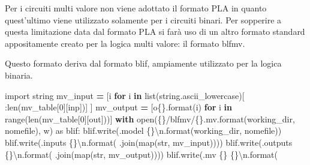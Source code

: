 \documentclass[
]{book}
\newenvironment{Shaded}{\begin{snugshade}}{\end{snugshade}}
\newcommand{\BuiltInTok}[1]{#1}
\newcommand{\CharTok}[1]{\textcolor[rgb]{0.31,0.60,0.02}{#1}}
\newcommand{\ControlFlowTok}[1]{\textcolor[rgb]{0.13,0.29,0.53}{\textbf{#1}}}
\newcommand{\DecValTok}[1]{\textcolor[rgb]{0.00,0.00,0.81}{#1}}
\newcommand{\ImportTok}[1]{#1}
\newcommand{\KeywordTok}[1]{\textcolor[rgb]{0.13,0.29,0.53}{\textbf{#1}}}
\newcommand{\NormalTok}[1]{#1}
\newcommand{\OperatorTok}[1]{\textcolor[rgb]{0.81,0.36,0.00}{\textbf{#1}}}
\newcommand{\SpecialCharTok}[1]{\textcolor[rgb]{0.00,0.00,0.00}{#1}}
\newcommand{\StringTok}[1]{\textcolor[rgb]{0.31,0.60,0.02}{#1}}
\begin{document}
Per i circuiti multi valore non viene adottato il formato PLA in quanto quest'ultimo viene utilizzato solamente per i circuiti binari. Per sopperire a questa limitazione data dal formato PLA si farà uso di un altro formato standard appositamente creato per la logica multi valore: il formato blfmv.

Questo formato deriva dal formato blif, ampiamente utilizzato per la logica binaria.

\begin{Shaded}
\begin{Highlighting}[]
\ImportTok{import}\NormalTok{ string}
\NormalTok{mv\_input }\OperatorTok{=}\NormalTok{ [i }\ControlFlowTok{for}\NormalTok{ i }\KeywordTok{in} \BuiltInTok{list}\NormalTok{(string.ascii\_lowercase)[}
\NormalTok{    :}\BuiltInTok{len}\NormalTok{(mv\_table[}\DecValTok{0}\NormalTok{][}\StringTok{\textquotesingle{}inp\textquotesingle{}}\NormalTok{])]}
\NormalTok{  ]}
\NormalTok{mv\_output }\OperatorTok{=}\NormalTok{ [}\StringTok{\textquotesingle{}o}\SpecialCharTok{\{\}}\StringTok{\textquotesingle{}}\NormalTok{.}\BuiltInTok{format}\NormalTok{(i) }\ControlFlowTok{for}\NormalTok{ i }\KeywordTok{in} \BuiltInTok{range}\NormalTok{(}\BuiltInTok{len}\NormalTok{(mv\_table[}\DecValTok{0}\NormalTok{][}\StringTok{\textquotesingle{}out\textquotesingle{}}\NormalTok{]))]}
\ControlFlowTok{with} \BuiltInTok{open}\NormalTok{(}\StringTok{\textquotesingle{}}\SpecialCharTok{\{\}}\StringTok{/blfmv/}\SpecialCharTok{\{\}}\StringTok{.mv\textquotesingle{}}\NormalTok{.}\BuiltInTok{format}\NormalTok{(working\_dir, nomefile), }\StringTok{\textquotesingle{}w\textquotesingle{}}\NormalTok{) }\ImportTok{as}\NormalTok{ blif:}
\NormalTok{  blif.write(}\StringTok{\textquotesingle{}.model }\SpecialCharTok{\{\}}\CharTok{\textbackslash{}n}\StringTok{\textquotesingle{}}\NormalTok{.}\BuiltInTok{format}\NormalTok{(working\_dir, nomefile))}
\NormalTok{  blif.write(}\StringTok{\textquotesingle{}.inputs }\SpecialCharTok{\{\}}\CharTok{\textbackslash{}n}\StringTok{\textquotesingle{}}\NormalTok{.}\BuiltInTok{format}\NormalTok{(}
      \StringTok{\textquotesingle{} \textquotesingle{}}\NormalTok{.join(}\BuiltInTok{map}\NormalTok{(}\BuiltInTok{str}\NormalTok{, mv\_input))))}
\NormalTok{  blif.write(}\StringTok{\textquotesingle{}.outputs }\SpecialCharTok{\{\}}\CharTok{\textbackslash{}n}\StringTok{\textquotesingle{}}\NormalTok{.}\BuiltInTok{format}\NormalTok{(}
      \StringTok{\textquotesingle{} \textquotesingle{}}\NormalTok{.join(}\BuiltInTok{map}\NormalTok{(}\BuiltInTok{str}\NormalTok{, mv\_output))))}
\NormalTok{  blif.write(}\StringTok{\textquotesingle{}.mv }\SpecialCharTok{\{\}}\StringTok{ }\SpecialCharTok{\{\}}\CharTok{\textbackslash{}n}\StringTok{\textquotesingle{}}\NormalTok{.}\BuiltInTok{format}\NormalTok{(}

\end{Highlighting}
\end{Shaded}
\end{document}
